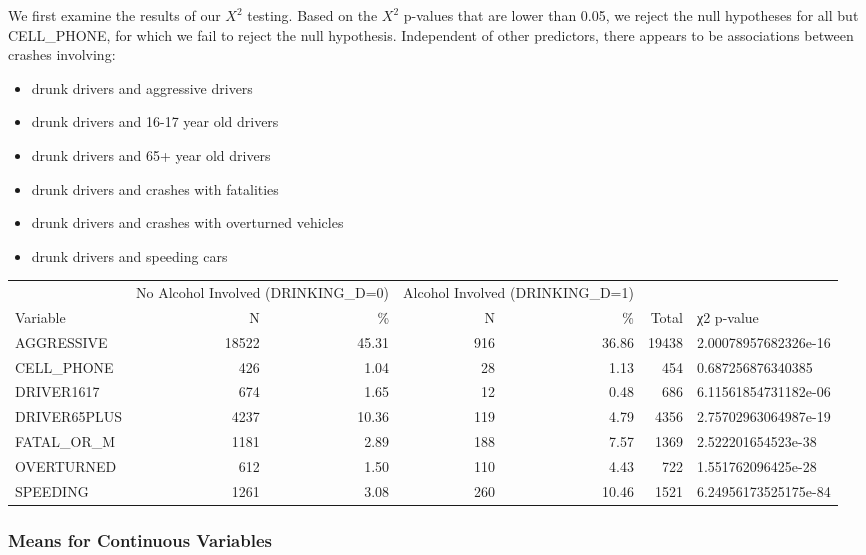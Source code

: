 \documentclass[
]{article}
\providecommand{\tightlist}{%
  \setlength{\itemsep}{0pt}\setlength{\parskip}{0pt}}
\begin{document}
We first examine the results of our \(X^2\) testing. Based on the
\(X^2\) p-values that are lower than 0.05, we reject the null hypotheses
for all but CELL\_PHONE, for which we fail to reject the null
hypothesis. Independent of other predictors, there appears to be
associations between crashes involving:

\begin{itemize}
\tightlist
\item
  drunk drivers and aggressive drivers
\item
  drunk drivers and 16-17 year old drivers
\item
  drunk drivers and 65+ year old drivers
\item
  drunk drivers and crashes with fatalities
\item
  drunk drivers and crashes with overturned vehicles
\item
  drunk drivers and speeding cars
\end{itemize}

\begin{table}
\centering
\begin{tabular}[t]{l|r|r|r|r|r|l}
\hline
\multicolumn{1}{c|}{ } & \multicolumn{2}{c|}{No Alcohol Involved (DRINKING\_D=0)} & \multicolumn{2}{c|}{Alcohol Involved (DRINKING\_D=1)} & \multicolumn{2}{c}{ } \\
\cline{2-3} \cline{4-5}
Variable & N & \% & N & \% & Total & χ2 p-value\\
\hline
AGGRESSIVE & 18522 & 45.31 & 916 & 36.86 & 19438 & 2.00078957682326e-16\\
\hline
CELL\_PHONE & 426 & 1.04 & 28 & 1.13 & 454 & 0.687256876340385\\
\hline
DRIVER1617 & 674 & 1.65 & 12 & 0.48 & 686 & 6.11561854731182e-06\\
\hline
DRIVER65PLUS & 4237 & 10.36 & 119 & 4.79 & 4356 & 2.75702963064987e-19\\
\hline
FATAL\_OR\_M & 1181 & 2.89 & 188 & 7.57 & 1369 & 2.522201654523e-38\\
\hline
OVERTURNED & 612 & 1.50 & 110 & 4.43 & 722 & 1.551762096425e-28\\
\hline
SPEEDING & 1261 & 3.08 & 260 & 10.46 & 1521 & 6.24956173525175e-84\\
\hline
\end{tabular}
\end{table}

\hypertarget{means-for-continuous-variables}{%
\subsubsection{Means for Continuous
Variables}\label{means-for-continuous-variables}}
\end{document}
